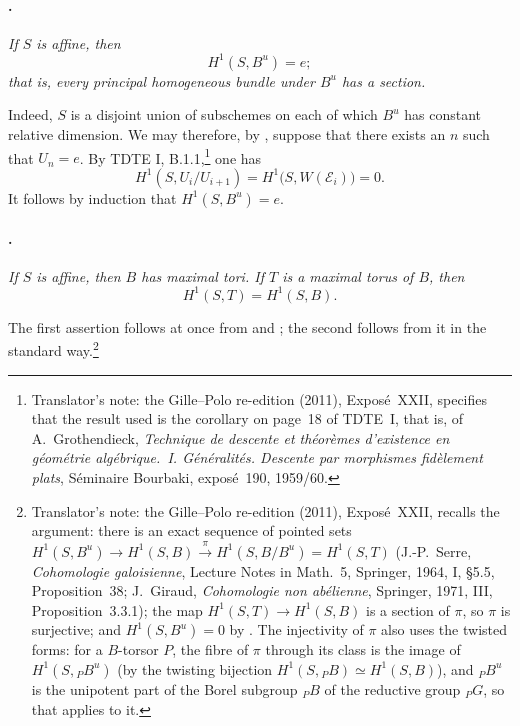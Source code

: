 \paragraph{.}
{\itshape If \(S\) is affine, then
\[
  H^1(S,B^u)=e;
\]
that is, every principal homogeneous bundle under \(B^u\) has a
section.}

Indeed, \(S\) is a disjoint union of subschemes on each of which
\(B^u\) has constant relative dimension. We may therefore, by
\textup{}, suppose that there exists an \(n\) such that \(U_n=e\).
By TDTE I, B.1.1,\footnote{Translator's note: the Gille--Polo re-edition (2011), Exposé~XXII, specifies that the result used
is the corollary on page~18 of TDTE~I, that is, of A.~Grothendieck,
\emph{Technique de descente et théorèmes d'existence en géométrie
algébrique.~I. Généralités. Descente par morphismes fidèlement plats},
Séminaire Bourbaki, exposé~190, 1959/60.} one has
\[
  H^1(S,U_i/U_{i+1})
  =
  H^1\bigl(S,W(\mathcal E_i)\bigr)
  =
  0.
\]
It follows by induction that \(H^1(S,B^u)=e\).

\paragraph{.}
{\itshape If \(S\) is affine, then \(B\) has maximal tori. If \(T\)
is a maximal torus of \(B\), then
\[
  H^1(S,T)=H^1(S,B).
\]}

The first assertion follows at once from  and ; the
second follows from it in the standard way.\footnote{Translator's note: the Gille--Polo re-edition (2011), Exposé~XXII, recalls
the argument: there is an exact sequence of pointed sets
\(H^1(S,B^u)\to H^1(S,B)\xrightarrow{\pi}H^1(S,B/B^u)=H^1(S,T)\)
(J.-P.~Serre, \emph{Cohomologie galoisienne}, Lecture Notes in Math.~5,
Springer, 1964, I, \S5.5, Proposition~38; J.~Giraud, \emph{Cohomologie non
abélienne}, Springer, 1971, III, Proposition~3.3.1); the map
\(H^1(S,T)\to H^1(S,B)\) is a section of \(\pi\), so \(\pi\) is surjective;
and \(H^1(S,B^u)=0\) by . The injectivity of \(\pi\) also uses the
twisted forms: for a \(B\)-torsor \(P\), the fibre of \(\pi\) through its
class is the image of \(H^1(S,{}_PB^u)\) (by the twisting bijection
\(H^1(S,{}_PB)\simeq H^1(S,B)\)), and \({}_PB^u\) is the unipotent part of the
Borel subgroup \({}_PB\) of the reductive group \({}_PG\), so that
 applies to it.}

